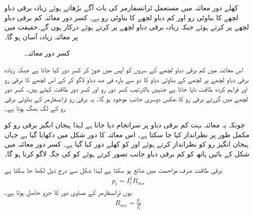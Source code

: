 کھلے دور معائنہ میں مستعمل  ٹرانسفارمر کی بات آگے بڑھاتے ہوئے زیادہ برقی دباو لچھے کا بناوٹی رو  اور کم  دباو  لچھے کا بناوٹی رو  ہے۔ کسر دور معائنہ کم برقی دباو لچھے پر کرتے ہوئے   جبکہ زیادہ برقی دباو لچھے پر  کرتے ہوئے   درکار ہوں گے۔حقیقت میں  پر معائنہ زیادہ آسان ہو گا۔
\begin{figure}
\centering
\caption{کسر دور معائنہ۔}
\label{شکل_ٹرانسفارمر_کسر_دور_معائنہ}
\end{figure}

اس معائنہ میں کم برقی دباو لچھے کے  سروں کو آپس میں جوڑ کر کسر دور کیا جاتا ہے  جبکہ زیادہ برقی دباو لچھے پر لچھے کے بناوٹی دباو کا دو سے بارہ  فی صد دباو   لاگو کر کے اس لچھے کا  برقی رو  اور فراہم کردہ طاقت  ناپا جاتا ہے جنہیں بالترتیب کسر دور رو اور کسر دور طاقت کہتے ہیں۔ کسر دور لچھے میں  گزرتے برقی رو  کا عکس دوسری جانب  موجود ہو گا۔ یہ برقی رو ٹرانسفارمر کے بناوٹی برقی رو کے لگ بھگ ہوتا ہے۔

 چونکہ یہ معائنہ بہت کم برقی دباو پر سرانجام دیا  جاتا ہے لہٰذا  ہیجان انگیز برقی رو کو مکمل طور پر نظرانداز کیا جا سکتا ہے۔ اس معائنہ کا دور شکل  میں دکھایا گیا ہے جہاں ہیجان انگیز رو کو نظرانداز کرتے ہوئے  اور  کو کھلے دور کیا گیا ہے۔  کسر دور معائنہ میں  شکل  کے بائیں ہاتھ کو کم برقی دباو  جانب تصور کرتے ہوئے   کو   کی جگہ لاگو کرنا ہو گا۔

برقی طاقت صرف مزاحمت میں  ضائع ہو سکتا ہے لہٰذا  شکل  سے درج ذیل لکھا جا سکتا ہے
\begin{align*}
p_t=I_t^2 R_{ms}
\end{align*}
یوں ٹرانسفارمر کے مساوی دور کا جزو  حاصل ہوتا ہے۔
\begin{align}\label{مساوات_ٹرانسفارمر_کسر_دور_مزاحمت_حاصل}
R_{ms}=\frac{p_t}{I_t^2}
\end{align}

